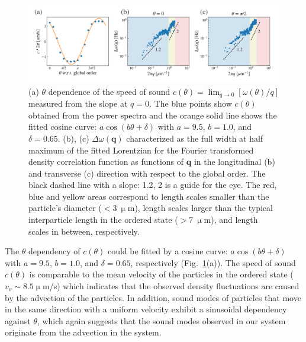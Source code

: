 \documentclass[%
 reprint,
 amsmath,amssymb,
 aps,
 floatfix
]{revtex4-2}
\begin{document}
\begin{figure}[tb]
\includegraphics[width=\columnwidth]{sup_density_prop.pdf}
\caption{\label{density_corr_prop} 
(a) $\theta$ dependence of the speed of sound $c(\theta)=\lim_{q\rightarrow 0}
\left[
\omega\left(\theta\right)/q
\right]$
measured from the slope at $q=0$. The blue points show $c(\theta)$ obtained from the power spectra and the orange solid line shows the fitted cosine curve: $a\cos{(b\theta+\delta)}$ with $a=9.5$, $b=1.0$, and $\delta=0.65$.
(b), (c) $\Delta\omega(\bm{q})$ characterized as the full width at half maximum of the fitted Lorentzian for the Fourier transformed density correlation function as functions of $\bm{q}$ in the longitudinal (b) and transverse (c) direction with respect to the global order. The black dashed line with a slope: 1.2, 2 is a guide for the eye. The red, blue and yellow areas correspond to length scales smaller than the particle's diameter  ($<3~\upmu$m), length scales larger than the typical interparticle length in the ordered state ($>7~\upmu$m), and length scales in between, respectively.
}
\end{figure}

The $\theta$ dependency of $c(\theta)$ could be fitted by a cosine curve: $a\cos{(b\theta+\delta)}$ with $a=9.5$, $b=1.0$, and $\delta=0.65$, respectively (Fig.~\ref{density_corr_prop}(a)). 
The speed of sound $c(\theta)$ is comparable to the mean velocity of the particles in the ordered state ($v_o\sim 8.5\upmu$m/s) which indicates that the observed density fluctuations are caused by the advection of the particles. In addition, sound modes of particles that move in the same direction with a uniform velocity exhibit a sinusoidal dependency against $\theta$, which again suggests that the sound modes observed in our system originate from the advection in the system.
\end{document}
